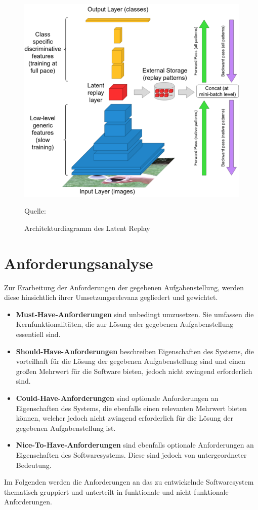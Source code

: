 \documentclass[oneside]{ausarbeitung}
\begin{document}
\begin{figure}[htbp]
  \centering
  \includegraphics[height=0.5\textheight]{images/latent-replay.png}
  \caption{Architekturdiagramm des Latent Replay} Quelle: \cite{Pellegrini2019}
  \label{fig:latent-replay}
\end{figure}
\chapter{Anforderungsanalyse}
\label{cha:analyse}
Zur Erarbeitung der Anforderungen der gegebenen Aufgabenstellung, werden diese hinsichtlich ihrer Umsetzungsrelevanz gegliedert und gewichtet.
\begin{itemize}
\item \textbf{Must-Have-Anforderungen} sind unbedingt umzusetzen. Sie umfassen die Kernfunktionalitäten, die zur Lösung der gegebenen Aufgabenstellung essentiell sind.
\item \textbf{Should-Have-Anforderungen} beschreiben Eigenschaften des Systems, die vorteilhaft für die Lösung der gegebenen Aufgabenstellung sind und einen großen Mehrwert für die Software bieten, jedoch nicht zwingend erforderlich sind.
\item \textbf{Could-Have-Anforderungen} sind optionale Anforderungen an Eigenschaften des Systems, die ebenfalls einen relevanten Mehrwert bieten können, welcher jedoch nicht zwingend erforderlich für die Lösung der gegebenen Aufgabenstellung ist. 
\item \textbf{Nice-To-Have-Anforderungen} sind ebenfalls optionale Anforderungen an Eigenschaften des Softwaresystems. Diese sind jedoch von untergeordneter Bedeutung.
\end{itemize}
Im Folgenden werden die Anforderungen an das zu entwickelnde Softwaresystem thematisch gruppiert und unterteilt in funktionale und nicht-funktionale Anforderungen.
\end{document}

